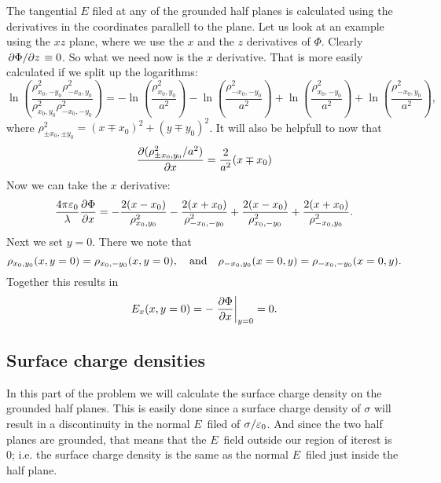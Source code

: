 \documentclass[11pt,letter, swedish, english
]{article}
\newcommand{\enaught}{\ensuremath\varepsilon_0}
\begin{document}
The tangential $E$ filed at any of the grounded half planes is
calculated using the derivatives in the coordinates parallell to the
plane. Let us look at an example using the $xz$ plane, where we use the $x$
and the $z$ derivatives of $\Phi$. Clearly $\pdv*{\Phi}{z}\equiv0$. So
what we need now is the $x$ derivative. That is more easily calculated
if we split up the logarithms:
\begin{equation}
\ln(\frac{\rho_{x_0,-y_0}^2\rho_{-x_0,y_0}^2}
{\rho_{x_0,y_0}^2\rho_{-x_0,-y_0}^2})
=-\ln(\frac{\rho_{x_0,y_0}^2}{a^2})-\ln(\frac{\rho_{-x_0,-y_0}^2}{a^2})
+\ln(\frac{\rho_{x_0,-y_0}^2}{a^2})+\ln(\frac{\rho_{-x_0,y_0}^2}{a^2}),
\end{equation}
where $\rho_{\pm x_0,\pm y_0}^2=(x\mp x_0)^2+(y\mp y_0)^2$. It will
also be helpfull to now that
\begin{equation}
\pdv{(\rho_{\pm x_0,y_0}^2/a^2)}{x}=\frac{2}{a^2}(x\mp x_0)
\end{equation}
Now we can take the $x$ derivative:
\begin{equation}\label{eq:5_dPhi/dx}
\frac{4\pi\enaught}{\lambda}\pdv{\Phi}{x}
=-\frac{2(x-x_0)}{\rho_{x_0,y_0}^2}
-\frac{2(x+x_0)}{\rho_{-x_0,-y_0}^2}
+\frac{2(x-x_0)}{\rho_{x_0,-y_0}^2}
+\frac{2(x+x_0)}{\rho_{-x_0,y_0}^2}.
\end{equation}
Next we set $y=0$. There we note that
\begin{equation}
\rho_{x_0,y_0}(x, y=0)=\rho_{x_0,-y_0}(x, y=0)
\qcomma\text{and}\quad
\rho_{-x_0,y_0}(x=0, y)=\rho_{-x_0,-y_0}(x=0, y).
\end{equation}
Together this results in
\begin{equation}
E_x(x, y=0)=-\eval{\pdv{\Phi}{x}}_{y=0}=0.
\end{equation}

\subsection{Surface charge densities}
In this part of the problem we will calculate the surface charge
density on the grounded half planes. This is easily done since a
surface charge density of $\sigma$ will result in a discontinuity in
the normal $E$~filed of $\sigma/\enaught$. And since the two half
planes are grounded, that means that the $E$~field outside our region
of iterest is 0; i.e. the surface charge density is the same as the
normal $E$~filed just inside the half plane. 
\end{document}
